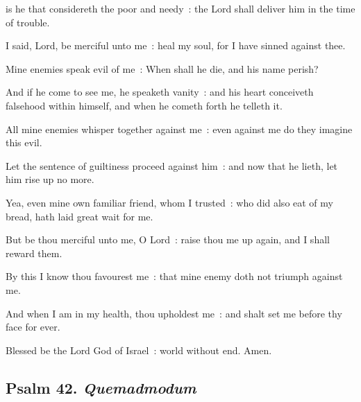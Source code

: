  is he that considereth the poor and needy~: the Lord shall deliver him in the time of trouble.\par
{}
I said, Lord, be merciful unto me~: heal my soul, for I have sinned against thee.\par
{}Mine enemies speak evil of me~: When shall he die, and his name perish?\par
{}And if he come to see me, he speaketh vanity~: and his heart conceiveth falsehood within himself, and when he cometh forth he telleth it.\par
{}All mine enemies whisper together against me~: even against me do they imagine this evil.\par
{}Let the sentence of guiltiness proceed against him~: and now that he lieth, let him rise up no more.\par
{}Yea, even mine own familiar friend, whom I trusted~: who did also eat of my bread, hath laid great wait for me.\par
{}But be thou merciful unto me, O Lord~: raise thou me up again, and I shall reward them.\par
{}By this I know thou favourest me~: that mine enemy doth not triumph against me.\par
{}And when I am in my health, thou upholdest me~: and shalt set me before thy face for ever.\par
{}Blessed be the Lord God of Israel~: world without end. Amen.\par

\subsection{Psalm 42. \textit{Quemadmodum}}


